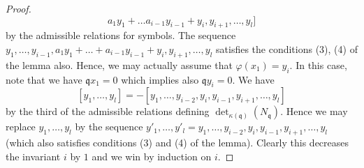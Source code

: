 \documentclass[10pt,a4paper]{amsart}
\theoremstyle{plain}
\theoremstyle{definition}
\theoremstyle{remark}
\numberwithin{equation}{subsection}
\begin{document}
\begin{proof}
$$a_1y_1 + \ldots a_{i - 1}y_{i - 1} + y_i, y_{i + 1}, \ldots, y_l]
$$
by the admissible relations for symbols. The sequence
$y_1, \ldots, y_{i - 1},
a_1y_1 + \ldots + a_{i - 1}y_{i - 1} + y_i, y_{i + 1}, \ldots, y_l$
satisfies the conditions (3), (4) of the lemma also.
Hence, we may actually
assume that $\varphi(x_1) = y_i$. In this case, note that we have
$\mathfrak q x_1 = 0$ which implies also $\mathfrak q y_i = 0$.
We have
$$
[y_1, \ldots, y_l] =
- [y_1, \ldots, y_{i - 2}, y_i, y_{i - 1}, y_{i + 1}, \ldots, y_l]
$$
by the third of the admissible relations defining
$\det_{\kappa(\mathfrak q)}(N_{\mathfrak q})$. Hence we may
replace $y_1, \ldots, y_l$ by
the sequence
$y'_1, \ldots, y'_l =
y_1, \ldots, y_{i - 2}, y_i, y_{i - 1}, y_{i + 1}, \ldots, y_l$
(which also satisfies conditions (3) and (4) of the lemma).
Clearly this decreases the invariant $i$ by $1$ and we win by induction
on $i$.
\end{proof}
\end{document}
